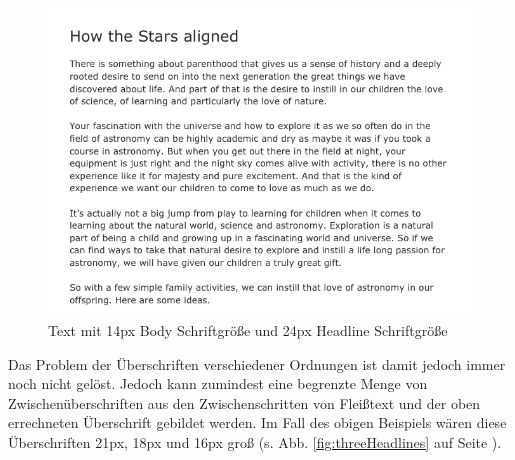 \begin{figure}[h]
    \centering
    \includegraphics[width=1\textwidth]{images/Proof-Golden-Ratio.png}
    \caption{Text mit 14px Body Schriftgröße und 24px Headline Schriftgröße}
    \label{fig:basicHeadline}
\end{figure}




Das Problem der Überschriften verschiedener Ordnungen ist damit jedoch immer noch nicht gelöst. Jedoch kann zumindest eine begrenzte Menge von Zwischenüberschriften aus den Zwischenschritten von Fleißtext und der oben errechneten Überschrift gebildet werden. Im Fall des obigen Beispiels wären diese Überschriften 21px, 18px und 16px groß (s. Abb. \ref{fig:threeHeadlines} auf Seite \pageref{fig:threeHeadlines}).

